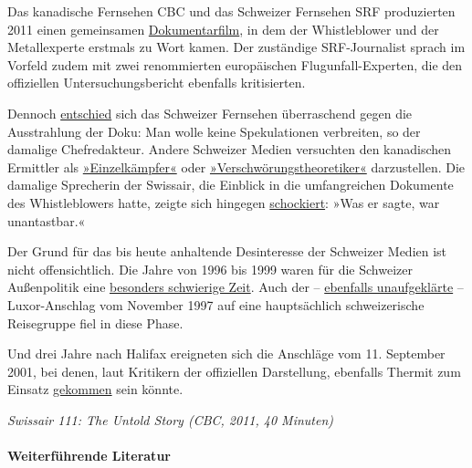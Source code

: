 Das kanadische Fernsehen CBC und das Schweizer Fernsehen SRF
produzierten 2011 einen gemeinsamen
\href{https://www.youtube.com/watch?v=s9rVKWsMv_g}{Dokumentarfilm}, in
dem der Whistleblower und der Metallexperte erstmals zu Wort kamen. Der
zuständige SRF-Journalist sprach im Vorfeld zudem mit zwei renommierten
europäischen Flugunfall-Experten, die den offiziellen
Untersuchungsbericht ebenfalls kritisierten.

Dennoch
\href{http://www.news.ch/SRF+strahlt+Halifax+Doku+nicht+aus/508488/detail.htm}{entschied}
sich das Schweizer Fernsehen überraschend gegen die Ausstrahlung der
Doku: Man wolle keine Spekulationen verbreiten, so der damalige
Chefredakteur. Andere Schweizer Medien versuchten den kanadischen
Ermittler als
\href{https://www.nzz.ch/ein_einzelkaempfer_will_keine_ruhe_geben-1.12534482}{»Einzelkämpfer«}
oder
\href{https://www.tagesanzeiger.ch/kultur/fernsehen/verschwoererische-doku-ueber-swissairtodesflug/story/17320616}{»Verschwörungs­theoretiker«}
darzustellen. Die damalige Sprecherin der Swissair, die Einblick in die
umfangreichen Dokumente des Whistleblowers hatte, zeigte sich hingegen
\href{http://www.news.ch/SRF+strahlt+Halifax+Doku+nicht+aus/508488/detail.htm}{schockiert}:
»Was er sagte, war unantastbar.«

Der Grund für das bis heute anhaltende Desinteresse der Schweizer Medien
ist nicht offensichtlich. Die Jahre von 1996 bis 1999 waren für die
Schweizer Außenpolitik eine
\href{https://interaktiv.bernerzeitung.ch/2018/schweizer-privatagenten/}{besonders
schwierige Zeit}. Auch der --
\href{https://en.wikipedia.org/wiki/Luxor_massacre}{ebenfalls
unaufgeklärte} -- Luxor-Anschlag vom November 1997 auf eine
hauptsächlich schweizerische Reisegruppe fiel in diese Phase.

Und drei Jahre nach Halifax ereigneten sich die Anschläge vom 11.
September 2001, bei denen, laut Kritikern der offiziellen Darstellung,
ebenfalls Thermit zum Einsatz
\href{https://en.wikipedia.org/wiki/World_Trade_Center_controlled_demolition_conspiracy_theories}{gekommen}
sein könnte.

\emph{Swissair 111: The Untold Story (CBC, 2011, 40 Minuten)}

\hypertarget{weiterfuxfchrende-literatur}{%
\paragraph{Weiterführende Literatur}\label{weiterfuxfchrende-literatur}}

